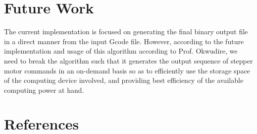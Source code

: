 \documentclass[12pt,letterpaper]{article}
\begin{document}
\section{Future Work}
The current implementation is focused on generating the final binary output file in a direct manner from the input Gcode file. However, according to the future implementation and usage of this algorithm according to Prof. Okwudire, we need to break the algorithm such that it generates the output sequence of stepper motor commands in an on-demand basis so as to efficiently use the storage space of the computing device involved, and providing best efficiency of the available computing power at hand.

\section{References\label{sec:references}}

\printbibliography[heading=none]
\end{document}
